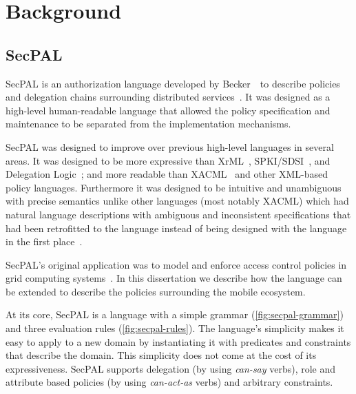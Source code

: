 \documentclass[thesis.tex]{subfiles}
\begin{document}
\chapter{Background}

\section{SecPAL}

SecPAL is an authorization language developed by Becker~\etal~to
describe policies and delegation chains surrounding distributed
services~\cite{becker_secpal:_2006}. It was designed as a high-level
human-readable language that allowed the policy specification and
maintenance to be separated from the implementation mechanisms.

SecPAL was designed to improve over previous high-level languages in
several areas.  It was designed to be more expressive than
XrML~\cite{kolovski_logic-based_2007},
SPKI/SDSI~\cite{ellison_spki_1999}, and Delegation
Logic~\cite{li_delegation_2003}; and more readable than
XACML~\cite{oasis_extensible_2013} and other XML-based policy
languages.  Furthermore it was designed to be intuitive and
unambiguous with precise semantics unlike other languages (most notably
XACML) which had natural language descriptions with ambiguous and
inconsistent specifications that had been retrofitted to the language
instead of being designed with the language in the first
place~\cite{bryans_reasoning_2005,ramli_logic_2014,masi_formalisation_2012}.

SecPAL's original application was to model and enforce access control
policies in grid computing systems~\cite{becker_secpal:_2006}.  In
this dissertation we describe how the language can be extended to
describe the policies surrounding the mobile ecosystem.

At its core, SecPAL is a language with a simple grammar
(\autoref{fig:secpal-grammar}) and three evaluation rules
(\autoref{fig:secpal-rules}). The language's simplicity makes it easy
to apply to a new domain by instantiating it with predicates and
constraints that describe the domain. This simplicity does not come at
the cost of its expressiveness. SecPAL supports delegation (by using
\emph{can-say} verbs), role and attribute based policies (by using
\emph{can-act-as} verbs) and arbitrary constraints.
\end{document}
